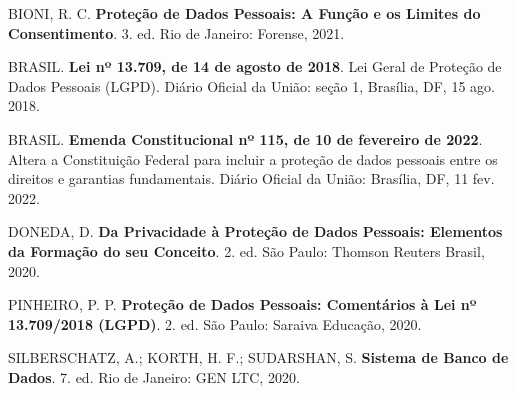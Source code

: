 \vspace{0.8em}
\noindent BIONI, R. C. \textbf{Proteção de Dados Pessoais: A Função e os Limites do Consentimento}. 3. ed. Rio de Janeiro: Forense, 2021.

\vspace{0.8em}
\noindent BRASIL. \textbf{Lei nº 13.709, de 14 de agosto de 2018}. Lei Geral de Proteção de Dados Pessoais (LGPD). Diário Oficial da União: seção 1, Brasília, DF, 15 ago. 2018.

\vspace{0.8em}
\noindent BRASIL. \textbf{Emenda Constitucional nº 115, de 10 de fevereiro de 2022}. Altera a Constituição Federal para incluir a proteção de dados pessoais entre os direitos e garantias fundamentais. Diário Oficial da União: Brasília, DF, 11 fev. 2022.

\vspace{0.8em}
\noindent DONEDA, D. \textbf{Da Privacidade à Proteção de Dados Pessoais: Elementos da Formação do seu Conceito}. 2. ed. São Paulo: Thomson Reuters Brasil, 2020.

\vspace{0.8em}
\noindent PINHEIRO, P. P. \textbf{Proteção de Dados Pessoais: Comentários à Lei nº 13.709/2018 (LGPD)}. 2. ed. São Paulo: Saraiva Educação, 2020.

\vspace{0.8em}
\noindent SILBERSCHATZ, A.; KORTH, H. F.; SUDARSHAN, S. \textbf{Sistema de Banco de Dados}. 7. ed. Rio de Janeiro: GEN LTC, 2020.
